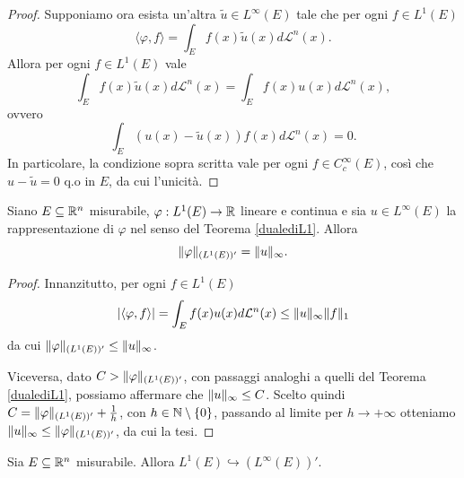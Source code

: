 \begin{proof}
	Supponiamo ora esista un'altra $\tilde{u} \in L^\infty(E)$ tale che per ogni $f \in L^{1}(E)$
	\[ \langle \varphi, f \rangle = \int_{E}f(x)\tilde{u}(x)d\mathcal{L}^{n}(x). \]
	Allora per ogni $f \in L^{1}(E)$ vale
	\[ \int_{E}f(x)\tilde{u}(x)d\mathcal{L}^{n}(x) = \int_{E}f(x)u(x)d\mathcal{L}^{n}(x),\]
	ovvero
	\[ \int_{E}(u(x)- \tilde{u}(x))f(x)d\mathcal{L}^{n}(x) =0.\]
	In particolare, la condizione sopra scritta vale per ogni $f \in C^{\infty}_{c}(E)$, così che $u - \tilde{u} = 0 $ q.o in $E$, da cui l'unicità.
\end{proof}

\begin{corollario}
	Siano $E \subseteq \mathbb{R}^{n}$ misurabile, $\varphi : L^{1}(E) \to \mathbb{R}$ lineare e continua e sia $u \in L^{\infty}(E)$ la rappresentazione di $\varphi$ nel senso del Teorema \eqref{dualediL1}. Allora 
	\[ 	\lVert\varphi\rVert_{(L^{1}(E))'} = \lVert u\rVert_{\infty}. \]
\end{corollario}

\begin{proof}
	Innanzitutto, per ogni $f \in L^{1}(E)$
	\[ \lvert\langle \varphi, f\rangle\rvert = \int_{E}f(x)u(x)d\mathcal{L}^{n}(x) \le \lVert u\rVert_{\infty}\lVert f\rVert_{1} \]
	da cui $\lVert\varphi\rVert_{(L^{1}(E))'}\le \lVert u\rVert_{\infty} $. 
	
	Viceversa, dato $C > \lVert\varphi\rVert_{(L^{1}(E))'} $, con passaggi analoghi a quelli del Teorema \eqref{dualediL1}, possiamo affermare che $\lVert u\rVert_{\infty} \le C$. Scelto quindi $C = \lVert\varphi\rVert_{(L^{1}(E))'} + \frac{1}{h}$, con $h \in \mathbb{N}\setminus \left\lbrace 0\right\rbrace $, passando al limite per $h \to +\infty$ otteniamo $\lVert u\rVert_{\infty} \le \lVert\varphi\rVert_{(L^{1}(E))'}$, da cui la tesi.
\end{proof}

\begin{proposizione}
	Sia $E \subseteq \mathbb{R}^{n} $ misurabile. Allora $L^{1}(E) \hookrightarrow (L^{\infty}(E))'$.
\end{proposizione}

